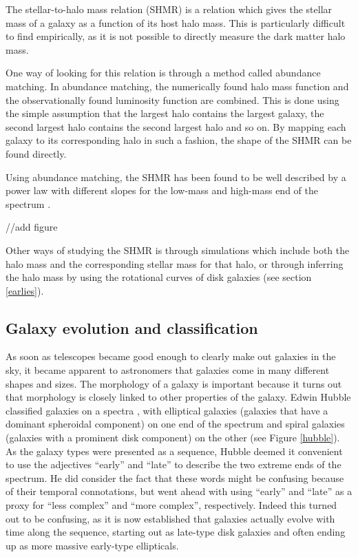 The stellar-to-halo mass relation (SHMR) is a relation which gives the stellar mass of a galaxy as a function of its host halo mass. This is particularly difficult to find empirically, as it is not possible to directly measure the dark matter halo mass. 

One way of looking for this relation is through a method called abundance matching. In abundance matching, the numerically found halo mass function and the observationally found luminosity function are combined. This is done using the simple assumption that the largest halo contains the largest galaxy, the second largest halo contains the second largest halo and so on. By mapping each galaxy to its corresponding halo in such a fashion, the shape of the SHMR can be found directly.

Using abundance matching, the SHMR has been found to be well described by a power law with different slopes for the low-mass and high-mass end of the spectrum \parencite{Behroozi2013}. 

//add figure

Other ways of studying the SHMR is through simulations which include both the halo mass and the corresponding stellar mass for that halo, or through inferring the halo mass by using the rotational curves of disk galaxies (see section \ref{earlies}).

\subsection{Galaxy evolution and classification}

As soon as telescopes became good enough to clearly make out galaxies in the sky, it became apparent to astronomers that galaxies come in many different shapes and sizes. The morphology of a galaxy is important because it turns out that morphology is closely linked to other properties of the galaxy. Edwin Hubble classified galaxies on a spectra \parencite{Hubble1926}, with elliptical galaxies (galaxies that have a dominant spheroidal component) on one end of the spectrum and spiral galaxies (galaxies with a prominent disk component) on the other (see Figure \ref{hubble}). As the galaxy types were presented as a sequence, Hubble deemed it convenient to use the adjectives ``early'' and ``late'' to describe the two extreme ends of the spectrum. He did consider the fact that these words might be confusing because of their temporal connotations, but went ahead with using ``early'' and ``late'' as a proxy for ``less complex'' and ``more complex'', respectively. Indeed this turned out to be confusing, as it is now established that galaxies actually evolve with time along the sequence, starting out as late-type disk galaxies and often ending up as more massive early-type ellipticals.


